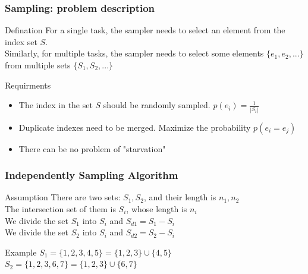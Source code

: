 \documentclass[notheorems, aspectratio=54]{beamer}
\begin{document}
\begin{frame}
    \frametitle{Sampling: problem description}
    \begin{block}{Defination}
        For a single task, the sampler needs to select an element from the index set $S$.\\
        Similarly, for multiple tasks, the sampler needs to select some elements $\{e_1, e_2, ...\}$ from multiple sets $\{S_1, S_2, ...\}$
    \end{block}
    \begin{block}{Requirments}
        \begin{itemize}
            \item The index in the set $S$ should be randomly sampled. $p(e_i) = \frac{1}{|S_i|}$
            \item Duplicate indexes need to be merged. Maximize the probability $p(e_i = e_j)$
            \item There can be no problem of "starvation"
        \end{itemize}
    \end{block}
\end{frame}

\begin{frame}
    \frametitle{Independently Sampling Algorithm}
    \begin{block}{Assumption}
        There are two sets: $S_1, S_2$, and their length is $n_1, n_2$ \\
        The intersection set of them is $S_i$, whose length is $n_i$ \\
        We divide the set $S_1$ into $S_i$ and $S_{d1} = S_1 - S_i$ \\
        We divide the set $S_2$ into $S_i$ and $S_{d2} = S_2 - S_i$
    \end{block}
    \begin{block}{Example}
        $S_1 = \{1,2,3,4,5\} = \{1,2,3\} \cup \{4,5\}$ \\
        $S_2 = \{1,2,3,6,7\} = \{1,2,3\} \cup \{6,7\}$
    \end{block}
\end{frame}
\end{document}
